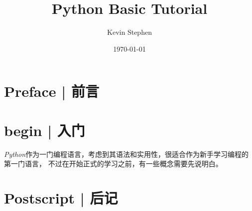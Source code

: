 \documentclass{ksbook}
\title{Python Basic Tutorial}
\author{Kevin Stephen}
\date{\today}
\newcommand{\Py}{\emph{Python}}
\begin{document}

\cls

\frontmatter

\pagestyle{plain}
\setcounter{page}{1}

\chapter*{Preface | 前言}
\label{ch:preface}

\cls

\setcounter{page}{1}

\tableofcontents
{}
\label{ch:contents}
\cls

\mainmatter

\pagestyle{fancy}
\setcounter{page}{1}

\chapter{begin | 入门}
\label{ch:begin}

\Py 作为一门编程语言，考虑到其语法和实用性，很适合作为新手学习编程的第一门语言，
不过在开始正式的学习之前，有一些概念需要先说明白。


\cls

\backmatter

\pagestyle{plain}
\setcounter{page}{1}

\chapter*{Postscript | 后记}
\label{ch:postscript}

\cls

\listoffigures
\label{ch:figures}
\cls
\end{document}
